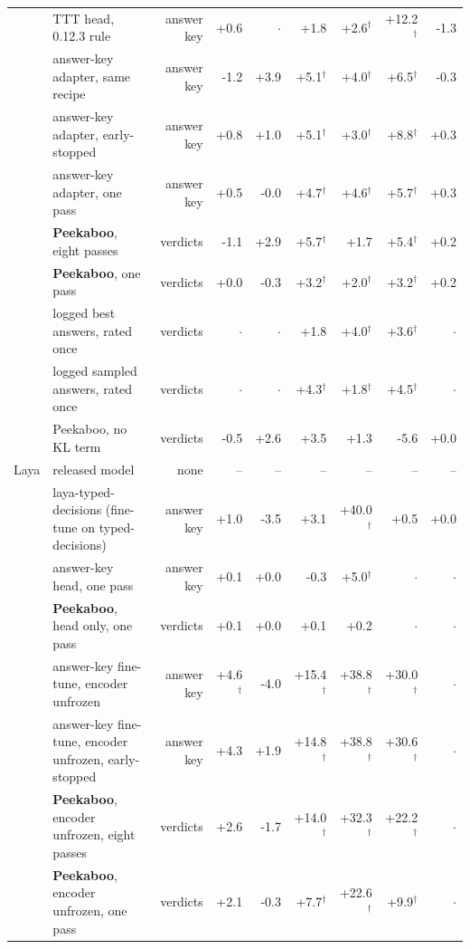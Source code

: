 \begin{table}[tbp]
{\begin{tabular}{llrrrrrrr}
 & TTT head, 0.12.3 rule & answer key & +0.6 & $\cdot$ & +1.8 & +2.6$^{\dagger}$ & +12.2$^{\dagger}$ & -1.3 \\
 & answer-key adapter, same recipe & answer key & -1.2 & +3.9 & +5.1$^{\dagger}$ & +4.0$^{\dagger}$ & +6.5$^{\dagger}$ & -0.3 \\
 & answer-key adapter, early-stopped & answer key & +0.8 & +1.0 & +5.1$^{\dagger}$ & +3.0$^{\dagger}$ & +8.8$^{\dagger}$ & +0.3 \\
 & answer-key adapter, one pass & answer key & +0.5 & -0.0 & +4.7$^{\dagger}$ & +4.6$^{\dagger}$ & +5.7$^{\dagger}$ & +0.3 \\
 & \textbf{Peekaboo}, eight passes & verdicts & -1.1 & +2.9 & +5.7$^{\dagger}$ & +1.7 & +5.4$^{\dagger}$ & +0.2 \\
 & \textbf{Peekaboo}, one pass & verdicts & +0.0 & -0.3 & +3.2$^{\dagger}$ & +2.0$^{\dagger}$ & +3.2$^{\dagger}$ & +0.2 \\
 & logged best answers, rated once & verdicts & $\cdot$ & $\cdot$ & +1.8 & +4.0$^{\dagger}$ & +3.6$^{\dagger}$ & $\cdot$ \\
 & logged sampled answers, rated once & verdicts & $\cdot$ & $\cdot$ & +4.3$^{\dagger}$ & +1.8$^{\dagger}$ & +4.5$^{\dagger}$ & $\cdot$ \\
 & Peekaboo, no KL term & verdicts & -0.5 & +2.6 & +3.5 & +1.3 & -5.6 & +0.0 \\
\addlinespace
Laya & released model & none & -- & -- & -- & -- & -- & -- \\
 & laya-typed-decisions (fine-tune on typed-decisions) & answer key & +1.0 & -3.5 & +3.1 & +40.0$^{\dagger}$ & +0.5 & +0.0 \\
 & answer-key head, one pass & answer key & +0.1 & +0.0 & -0.3 & +5.0$^{\dagger}$ & $\cdot$ & $\cdot$ \\
 & \textbf{Peekaboo}, head only, one pass & verdicts & +0.1 & +0.0 & +0.1 & +0.2 & $\cdot$ & $\cdot$ \\
 & answer-key fine-tune, encoder unfrozen & answer key & +4.6$^{\dagger}$ & -4.0 & +15.4$^{\dagger}$ & +38.8$^{\dagger}$ & +30.0$^{\dagger}$ & $\cdot$ \\
 & answer-key fine-tune, encoder unfrozen, early-stopped & answer key & +4.3 & +1.9 & +14.8$^{\dagger}$ & +38.8$^{\dagger}$ & +30.6$^{\dagger}$ & $\cdot$ \\
 & \textbf{Peekaboo}, encoder unfrozen, eight passes & verdicts & +2.6 & -1.7 & +14.0$^{\dagger}$ & +32.3$^{\dagger}$ & +22.2$^{\dagger}$ & $\cdot$ \\
 & \textbf{Peekaboo}, encoder unfrozen, one pass & verdicts & +2.1 & -0.3 & +7.7$^{\dagger}$ & +22.6$^{\dagger}$ & +9.9$^{\dagger}$ & $\cdot$ \\
\bottomrule
\end{tabular}}
\end{table}
